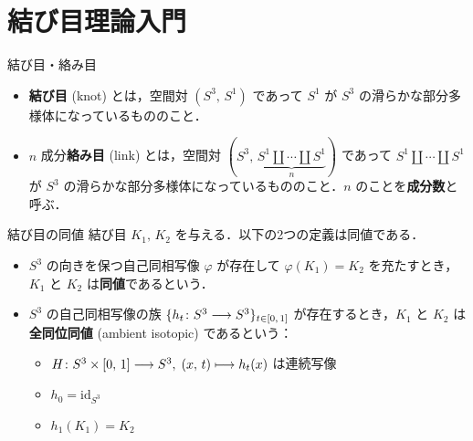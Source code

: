 \documentclass[TQFT_main]{subfiles}
\begin{document}
\chapter{結び目理論入門}

\begin{mydef}[label=def:knot]{結び目・絡み目}
    \begin{itemize}
        \item \textbf{結び目} (knot) とは，空間対 $(S^3,\, S^1)$ であって $S^1$ が $S^3$ の滑らかな部分多様体になっているもののこと．
        \item $n$ 成分\textbf{絡み目} (link) とは，空間対 $(S^3,\, \underbrace{S^1 \amalg \cdots \amalg S^1}_n)$ であって $S^1 \amalg \cdots \amalg S^1$ が $S^3$ の滑らかな部分多様体になっているもののこと．$n$ のことを\textbf{成分数}と呼ぶ．
    \end{itemize}
\end{mydef}

\begin{mydef}[label=def:knot-equiv]{結び目の同値}
    結び目 $K_1,\, K_2$ を与える．以下の2つの定義は同値である．
    \begin{itemize}
        \item $S^3$ の向きを保つ自己同相写像 $\varphi$ が存在して $\varphi(K_1) = K_2$ を充たすとき，$K_1$ と $K_2$ は\textbf{同値}であるという．
        \item $S^3$ の自己同相写像の族 $\{h_t \colon S^3 \longrightarrow S^3\}_{t \in [0,\, 1]}$ が存在するとき，$K_1$ と $K_2$ は\textbf{全同位同値} (ambient isotopic) であるという：
        \begin{itemize}
            \item $H \colon S^3 \times [0,\, 1] \longrightarrow S^3,\; (x,\, t) \longmapsto h_t(x)$ は連続写像
            \item $h_0 = \mathrm{id}_{S^3}$
            \item $h_1(K_1) = K_2$
        \end{itemize}
    \end{itemize}
\end{mydef}
\end{document}
